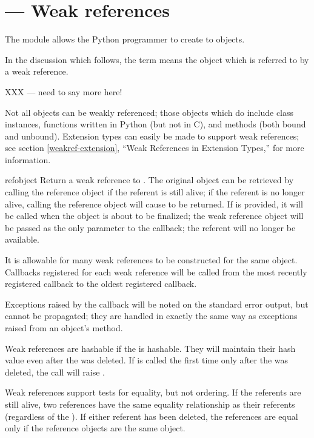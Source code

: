 \section{ ---
         Weak references}




The  module allows the Python programmer to create
 to objects.

In the discussion which follows, the term  means the
object which is referred to by a weak reference.

XXX --- need to say more here!

Not all objects can be weakly referenced; those objects which do
include class instances, functions written in Python (but not in C),
and methods (both bound and unbound).  Extension types can easily
be made to support weak references; see section \ref{weakref-extension},
``Weak References in Extension Types,'' for more information.


\begin{funcdesc}{ref}{object}
  Return a weak reference to .  The original object can be
  retrieved by calling the reference object if the referent is still
  alive; if the referent is no longer alive, calling the reference
  object will cause  to be returned.  If  is
  provided, it will be called when the object is about to be
  finalized; the weak reference object will be passed as the only
  parameter to the callback; the referent will no longer be available.

  It is allowable for many weak references to be constructed for the
  same object.  Callbacks registered for each weak reference will be
  called from the most recently registered callback to the oldest
  registered callback.

  Exceptions raised by the callback will be noted on the standard
  error output, but cannot be propagated; they are handled in exactly
  the same way as exceptions raised from an object's
   method.
  
  Weak references are hashable if the  is hashable.  They
  will maintain their hash value even after the  was
  deleted.  If  is called the first time only after
  the  was deleted, the call will raise
  .
  
  Weak references support tests for equality, but not ordering.  If
  the referents are still alive, two references have the same
  equality relationship as their referents (regardless of the
  ).  If either referent has been deleted, the
  references are equal only if the reference objects are the same
  object.
\end{funcdesc}

